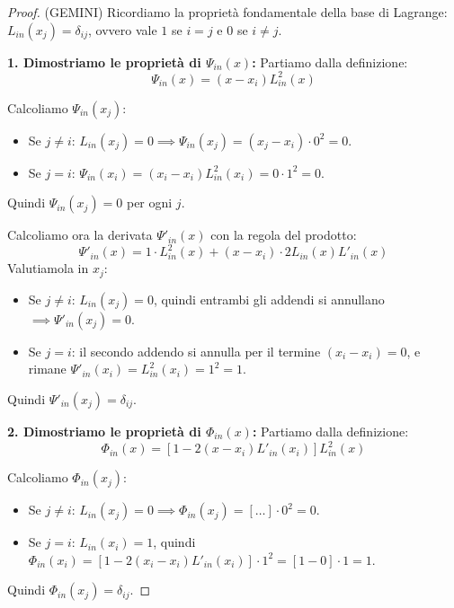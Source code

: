     \begin{proof}
    (GEMINI) Ricordiamo la proprietà fondamentale della base di Lagrange: $L_{in}(x_j) = \delta_{ij}$, ovvero vale $1$ se $i=j$ e $0$ se $i \neq j$.
    
    \textbf{1. Dimostriamo le proprietà di $\Psi_{in}(x)$:}
    Partiamo dalla definizione:
    $$ \Psi_{in}(x) = (x - x_i)L_{in}^2(x) $$
    
    Calcoliamo $\Psi_{in}(x_j)$:
    \begin{itemize}
        \item Se $j \neq i$: $L_{in}(x_j) = 0 \implies \Psi_{in}(x_j) = (x_j - x_i) \cdot 0^2 = 0$.
        \item Se $j = i$: $\Psi_{in}(x_i) = (x_i - x_i)L_{in}^2(x_i) = 0 \cdot 1^2 = 0$.
    \end{itemize}
    Quindi $\Psi_{in}(x_j) = 0$ per ogni $j$.
    
    Calcoliamo ora la derivata $\Psi'_{in}(x)$ con la regola del prodotto:
    $$ \Psi'_{in}(x) = 1 \cdot L_{in}^2(x) + (x - x_i) \cdot 2L_{in}(x)L'_{in}(x) $$
    Valutiamola in $x_j$:
    \begin{itemize}
        \item Se $j \neq i$: $L_{in}(x_j) = 0$, quindi entrambi gli addendi si annullano $\implies \Psi'_{in}(x_j) = 0$.
        \item Se $j = i$: il secondo addendo si annulla per il termine $(x_i - x_i)=0$, e rimane $\Psi'_{in}(x_i) = L_{in}^2(x_i) = 1^2 = 1$.
    \end{itemize}
    Quindi $\Psi'_{in}(x_j) = \delta_{ij}$.
    
    \vspace{0.3cm}
    \textbf{2. Dimostriamo le proprietà di $\Phi_{in}(x)$:}
    Partiamo dalla definizione:
    $$ \Phi_{in}(x) = [1 - 2(x - x_i)L'_{in}(x_i)] L_{in}^2(x) $$
    
    Calcoliamo $\Phi_{in}(x_j)$:
    \begin{itemize}
        \item Se $j \neq i$: $L_{in}(x_j) = 0 \implies \Phi_{in}(x_j) = [\dots] \cdot 0^2 = 0$.
        \item Se $j = i$: $L_{in}(x_i) = 1$, quindi $\Phi_{in}(x_i) = [1 - 2(x_i - x_i)L'_{in}(x_i)] \cdot 1^2 = [1 - 0] \cdot 1 = 1$.
    \end{itemize}
    Quindi $\Phi_{in}(x_j) = \delta_{ij}$.
    

\end{proof}

